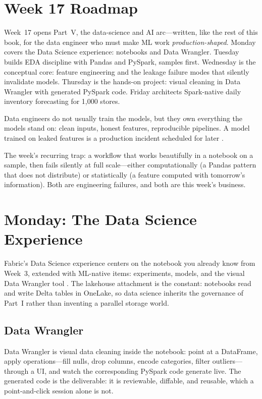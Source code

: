 \section{Week 17 Roadmap}
Week~17 opens Part~V, the data-science and AI arc---written, like the rest of this book, for the data engineer who must make ML work \emph{production-shaped}. Monday covers the Data Science experience: notebooks and Data Wrangler. Tuesday builds EDA discipline with Pandas and PySpark, samples first. Wednesday is the conceptual core: feature engineering and the leakage failure modes that silently invalidate models. Thursday is the hands-on project: visual cleaning in Data Wrangler with generated PySpark code. Friday architects Spark-native daily inventory forecasting for 1,000 stores.

Data engineers do not usually train the models, but they own everything the models stand on: clean inputs, honest features, reproducible pipelines. A model trained on leaked features is a production incident scheduled for later \cite{microsoftFabricDataScience}.

\begin{notebox}
The week's recurring trap: a workflow that works beautifully in a notebook on a sample, then fails silently at full scale---either computationally (a Pandas pattern that does not distribute) or statistically (a feature computed with tomorrow's information). Both are engineering failures, and both are this week's business.
\end{notebox}

\section{Monday: The Data Science Experience}
Fabric's Data Science experience centers on the notebook you already know from Week~3, extended with ML-native items: experiments, models, and the visual Data Wrangler tool \cite{microsoftFabricDataScience}. The lakehouse attachment is the constant: notebooks read and write Delta tables in OneLake, so data science inherits the governance of Part~I rather than inventing a parallel storage world.

\subsection{Data Wrangler}
Data Wrangler is visual data cleaning inside the notebook: point at a DataFrame, apply operations---fill nulls, drop columns, encode categories, filter outliers---through a UI, and watch the corresponding PySpark code generate live. The generated code is the deliverable: it is reviewable, diffable, and reusable, which a point-and-click session alone is not.

